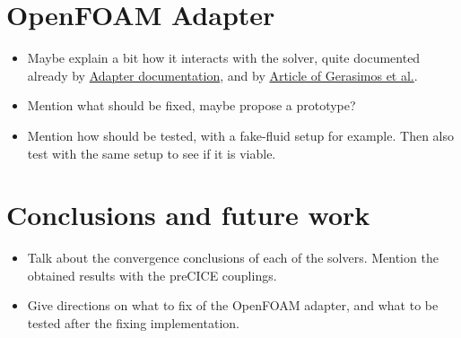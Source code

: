 \documentclass[
  english,        %
  font=times,     %
  onecolumn,      %
]{tumarticle}
\begin{document}
\section{OpenFOAM Adapter}
\begin{itemize}
    \item Maybe explain a bit how it interacts with the solver, quite documented already by \href{https://precice.org/adapter-openfoam-extend.html}{Adapter documentation}, and by \href{https://journal.openfoam.com/index.php/ofj/article/view/88/78}{Article of Gerasimos et al.}.
    \item Mention what should be fixed, maybe propose a prototype?
    \item Mention how should be tested, with a fake-fluid setup for example. Then also test with the same setup to see if it is viable.
\end{itemize}

\section{Conclusions and future work}
\begin{itemize}
    \item Talk about the convergence conclusions of each of the solvers. Mention the obtained results with the preCICE couplings.
    \item Give directions on what to fix of the OpenFOAM adapter, and what to be tested after the fixing implementation.
     
\end{itemize}
\end{document}
